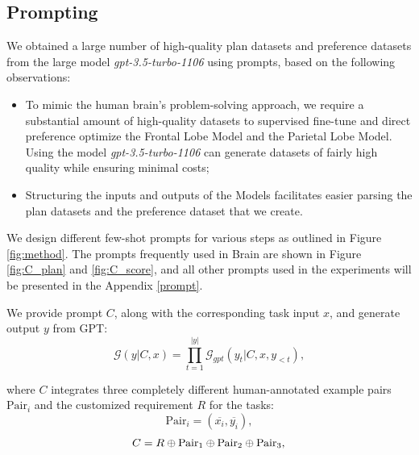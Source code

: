 \documentclass[11pt]{article}
\begin{document}
\subsection{Prompting}
\label{subsec:3.2}

We obtained a large number of high-quality plan datasets and preference datasets from the large model \textit{gpt-3.5-turbo-1106} using prompts, based on the following observations:
\begin{itemize}
    \item To mimic the human brain's problem-solving approach, we require a substantial amount of high-quality datasets to supervised fine-tune and direct preference optimize the Frontal Lobe Model and the Parietal Lobe Model. Using the model \textit{gpt-3.5-turbo-1106} can generate datasets of fairly high quality while ensuring minimal costs;
    \item Structuring the inputs and outputs of the Models facilitates easier parsing the plan datasets and the preference dataset that we create.
\end{itemize}



We design different few-shot prompts for various steps as outlined in Figure \ref{fig:method}. The prompts frequently used in Brain are shown in Figure \ref{fig:C_plan} and \ref{fig:C_score}, and all other prompts used in the experiments will be presented in the Appendix \ref{prompt}. 

We provide prompt $C$, along with the corresponding task input $x$, and generate output $y$ from GPT:
\begin{equation}
    \mathcal{G}(y|C,x) = \prod_{t=1}^{|y|}\mathcal{G}_{gpt}(y_t|C,x,y_{<t}),
\end{equation}


where $C$ integrates three completely different human-annotated example pairs $\mathrm{Pair}_i$ and the customized requirement $R$ for the tasks:
\begin{equation}
    \mathrm{Pair}_i = (\overline{x_i},\overline{y_i}),
\end{equation}
\begin{equation}
    C = R \oplus \mathrm{Pair}_1 \oplus \mathrm{Pair}_2 \oplus \mathrm{Pair}_3, \\
\end{equation}
\end{document}
